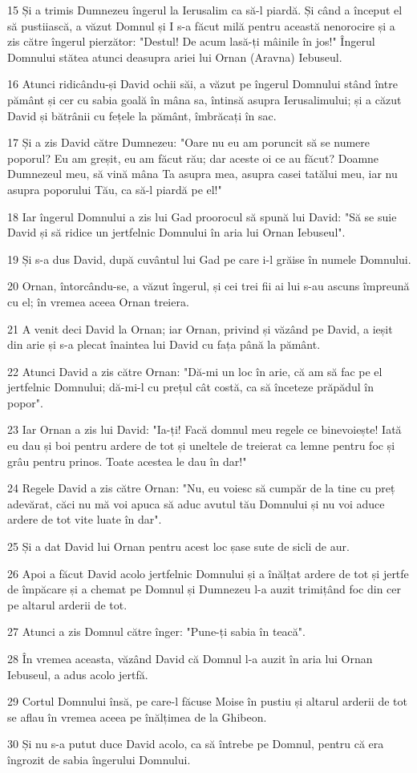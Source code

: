 \par 15 Și a trimis Dumnezeu îngerul la Ierusalim ca să-l piardă. Și când a început el să pustiiască, a văzut Domnul și I s-a făcut milă pentru această nenorocire și a zis către îngerul pierzător: "Destul! De acum lasă-ți mâinile în jos!" Îngerul Domnului stătea atunci deasupra ariei lui Ornan (Aravna) Iebuseul.
\par 16 Atunci ridicându-și David ochii săi, a văzut pe îngerul Domnului stând între pământ și cer cu sabia goală în mâna sa, întinsă asupra Ierusalimului; și a căzut David și bătrânii cu fețele la pământ, îmbrăcați în sac.
\par 17 Și a zis David către Dumnezeu: "Oare nu eu am poruncit să se numere poporul? Eu am greșit, eu am făcut rău; dar aceste oi ce au făcut? Doamne Dumnezeul meu, să vină mâna Ta asupra mea, asupra casei tatălui meu, iar nu asupra poporului Tău, ca să-l piardă pe el!"
\par 18 Iar îngerul Domnului a zis lui Gad proorocul să spună lui David: "Să se suie David și să ridice un jertfelnic Domnului în aria lui Ornan Iebuseul".
\par 19 Și s-a dus David, după cuvântul lui Gad pe care i-l grăise în numele Domnului.
\par 20 Ornan, întorcându-se, a văzut îngerul, și cei trei fii ai lui s-au ascuns împreună cu el; în vremea aceea Ornan treiera.
\par 21 A venit deci David la Ornan; iar Ornan, privind și văzând pe David, a ieșit din arie și s-a plecat înaintea lui David cu fața până la pământ.
\par 22 Atunci David a zis către Ornan: "Dă-mi un loc în arie, că am să fac pe el jertfelnic Domnului; dă-mi-l cu prețul cât costă, ca să înceteze prăpădul în popor".
\par 23 Iar Ornan a zis lui David: "Ia-ți! Facă domnul meu regele ce binevoiește! Iată eu dau și boi pentru ardere de tot și uneltele de treierat ca lemne pentru foc și grâu pentru prinos. Toate acestea le dau în dar!"
\par 24 Regele David a zis către Ornan: "Nu, eu voiesc să cumpăr de la tine cu preț adevărat, căci nu mă voi apuca să aduc avutul tău Domnului și nu voi aduce ardere de tot vite luate în dar".
\par 25 Și a dat David lui Ornan pentru acest loc șase sute de sicli de aur.
\par 26 Apoi a făcut David acolo jertfelnic Domnului și a înălțat ardere de tot și jertfe de împăcare și a chemat pe Domnul și Dumnezeu l-a auzit trimițând foc din cer pe altarul arderii de tot.
\par 27 Atunci a zis Domnul către înger: "Pune-ți sabia în teacă".
\par 28 În vremea aceasta, văzând David că Domnul l-a auzit în aria lui Ornan Iebuseul, a adus acolo jertfă.
\par 29 Cortul Domnului însă, pe care-l făcuse Moise în pustiu și altarul arderii de tot se aflau în vremea aceea pe înălțimea de la Ghibeon.
\par 30 Și nu s-a putut duce David acolo, ca să întrebe pe Domnul, pentru că era îngrozit de sabia îngerului Domnului.


